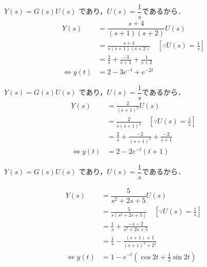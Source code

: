 \documentclass[a4paper,12pt]{article}
\begin{document}
\begin{tcolorbox}[title={8.(1) \(G(s) = \dfrac{s+4}{(s+1)(s+2)}\) }]

    \qquad \(Y(s) =G(s)U(s)\) であり，\(U(s)=\dfrac{1}{s}\)であるから． 
    \begin{align*}
        Y(s)
        &= \dfrac{s+4}{(s+1)(s+2)}U(s) \\
        &= \frac{s+4}{s(s+1)(s+2)} \quad [\because U(s)=\frac{1}{s}]\\
        &= \frac{2}{s} + \frac{-3}{s+1} + \frac{1}{s+2}\\
        \Leftrightarrow y(t) &=2 - 3e^{-t} + e^{-2t}
    \end{align*}

\end{tcolorbox}

\begin{tcolorbox}[title={8.(2) \(G(s) = \dfrac{2}{(s+1)^2}\) }]

    \qquad \(Y(s) =G(s)U(s)\) であり，\(U(s)=\dfrac{1}{s}\)であるから． 
    \begin{align*}
        Y(s)
        &= \frac{2}{(s+1)^2}U(s) \\
        &= \frac{2}{s(s+1)^2} \quad [\because U(s)=\frac{1}{s}]\\
        &= \frac{2}{s} + \frac{-2}{(s+1)^2} + \frac{-2}{s+1}\\
        \Leftrightarrow y(t) &=2 - 2e^{-t}(t+1) 
    \end{align*}

\end{tcolorbox}

\begin{tcolorbox}[title={8.(3) \(G(s) = \dfrac{5}{s^2+2s+5}\) }]

    \qquad \(Y(s) =G(s)U(s)\) であり，\(U(s)=\dfrac{1}{s}\)であるから． 

    \begin{align*}
        Y(s)
        &= \dfrac{5}{s^2+2s+5}U(s) \\
        &= \frac{5}{s(s^2+2s+5)} \quad [\because U(s)=\frac{1}{s}]\\
        &= \frac{1}{s} + \frac{-s-2}{s^2+2s+5}\\
        &= \frac{1}{s} - \frac{(s+1)+1}{(s+1)^2+2^2}\\
        \Leftrightarrow y(t) &=1-e^{-t}(\cos 2t + \frac{1}{2} \sin 2t) 
    \end{align*}

\end{tcolorbox}
\end{document}
